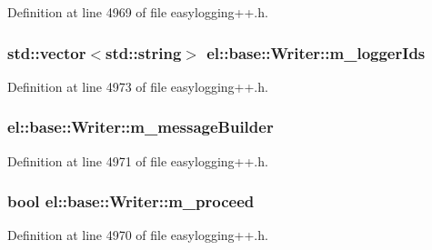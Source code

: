 Definition at line 4969 of file easylogging++.\+h.

\hypertarget{classel_1_1base_1_1_writer_a9137860437510e1a26e8b0c1814c7ae7}{}
\subsubsection[{m\+\_\+logger\+Ids}]{\setlength{\rightskip}{0pt plus 5cm}std\+::vector$<$std\+::string$>$ el\+::base\+::\+Writer\+::m\+\_\+logger\+Ids\hspace{0.3cm}{\ttfamily [protected]}}\label{classel_1_1base_1_1_writer_a9137860437510e1a26e8b0c1814c7ae7}


Definition at line 4973 of file easylogging++.\+h.

\hypertarget{classel_1_1base_1_1_writer_a63763a047d595271cb14f9a80430306b}{}
\subsubsection[{m\+\_\+message\+Builder}]{ el\+::base\+::\+Writer\+::m\+\_\+message\+Builder\hspace{0.3cm}{\ttfamily [protected]}}\label{classel_1_1base_1_1_writer_a63763a047d595271cb14f9a80430306b}


Definition at line 4971 of file easylogging++.\+h.

\hypertarget{classel_1_1base_1_1_writer_a238593eda90cf32645c4541e738bea9a}{}
\subsubsection[{m\+\_\+proceed}]{\setlength{\rightskip}{0pt plus 5cm}bool el\+::base\+::\+Writer\+::m\+\_\+proceed\hspace{0.3cm}{\ttfamily [protected]}}\label{classel_1_1base_1_1_writer_a238593eda90cf32645c4541e738bea9a}


Definition at line 4970 of file easylogging++.\+h.

